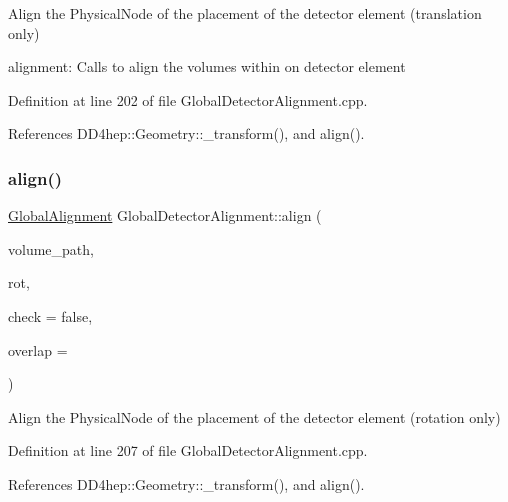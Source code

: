 Align the Physical\+Node of the placement of the detector element (translation only) 

alignment\+: Calls to align the volumes within on detector element 

Definition at line 202 of file Global\+Detector\+Alignment.\+cpp.



References D\+D4hep\+::\+Geometry\+::\+\_\+transform(), and align().

\hypertarget{class_d_d4hep_1_1_alignments_1_1_global_detector_alignment_ad5277f0db4db98a272e2e58055d3e240}{}\label{class_d_d4hep_1_1_alignments_1_1_global_detector_alignment_ad5277f0db4db98a272e2e58055d3e240} 
\subsubsection{\texorpdfstring{align()}{align()}\hspace{0.1cm}{\footnotesize\ttfamily [7/10]}}
{\footnotesize\ttfamily \hyperlink{class_d_d4hep_1_1_alignments_1_1_global_alignment}{Global\+Alignment} Global\+Detector\+Alignment\+::align (\begin{DoxyParamCaption}\item[{const std\+::string \&}]{volume\+\_\+path,  }\item[{const Rotation\+Z\+YX \&}]{rot,  }\item[{bool}]{check = {\ttfamily false},  }\item[{double}]{overlap = {} }\end{DoxyParamCaption})}



Align the Physical\+Node of the placement of the detector element (rotation only) 



Definition at line 207 of file Global\+Detector\+Alignment.\+cpp.



References D\+D4hep\+::\+Geometry\+::\+\_\+transform(), and align().

\hypertarget{class_d_d4hep_1_1_alignments_1_1_global_detector_alignment_ae58f439974af5028309077b14688d51b}{}\label{class_d_d4hep_1_1_alignments_1_1_global_detector_alignment_ae58f439974af5028309077b14688d51b} 
